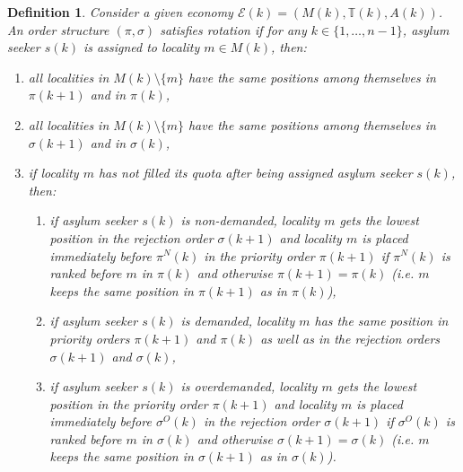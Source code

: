 \documentclass[12pt,fleqn]{article}
\newtheorem{definition}{Definition}
\begin{document}
\begin{definition}\rm\label{DEF:Rotation2}
Consider a given economy $\mathcal{E}(k)=(M(k),\mathbb{T}(k),A(k))$. An order structure $(\pi,\sigma)$ satisfies rotation if for any $k\in\{1,\ldots,n-1\}$, asylum seeker $s(k)$ is assigned to locality $m\in M(k)$, then:
\begin{enumerate}
\item[(i)] all localities in $M(k)\setminus \{m\}$ have the same positions among themselves in $\pi(k+1)$ and in $\pi(k)$,
\item[(ii)] all localities in $M(k)\setminus \{m\}$ have the same positions among themselves in $\sigma(k+1)$ and in $\sigma(k)$,
\item[(iii)] if locality $m$ has not filled its quota after being assigned asylum seeker $s(k)$, then:
\begin{enumerate}
\item[(a)] if asylum seeker $s(k)$ is non-demanded, locality $m$ gets the lowest position in the rejection order $\sigma(k+1)$ and locality $m$ is placed immediately before $\pi^{N}(k)$ in the priority order $\pi(k+1)$ if $\pi^N(k)$ is ranked before $m$ in $\pi(k)$ and otherwise $\pi(k+1)=\pi(k)$ (i.e. $m$ keeps the same position in $\pi(k+1)$ as in $\pi(k)$),
\item[(b)] if asylum seeker $s(k)$ is demanded, locality $m$ has the same position in priority orders $\pi(k+1)$ and $\pi(k)$ as well as in the rejection orders $\sigma(k+1)$ and $\sigma(k)$,
\item[(c)] if asylum seeker $s(k)$ is overdemanded, locality $m$ gets the lowest position in the priority order $\pi(k+1)$ and locality $m$ is placed immediately before $\sigma^{O}(k)$ in the rejection order $\sigma(k+1)$ if $\sigma^O(k)$ is ranked before $m$ in $\sigma(k)$ and otherwise $\sigma(k+1)=\sigma(k)$ (i.e. $m$ keeps the same position in $\sigma(k+1)$ as in $\sigma(k)$).
\end{enumerate}
\end{enumerate}
\end{definition}
\end{document}
